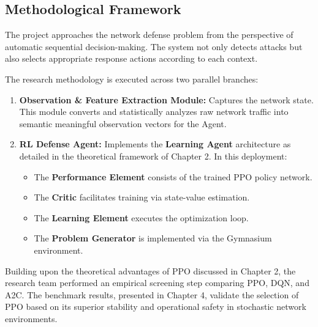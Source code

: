 \documentclass[12pt,a4paper]{report}
\begin{document}
\subsection{Methodological Framework}

The project approaches the network defense problem from the perspective of automatic sequential decision-making. The system not only detects attacks but also selects appropriate response actions according to each context.

The research methodology is executed across two parallel branches:
\begin{enumerate}
    \item \textbf{Observation \& Feature Extraction Module:} Captures the network state. This module converts and statistically analyzes raw network traffic into semantic meaningful observation vectors for the Agent.
    \item \textbf{RL Defense Agent:} Implements the \textbf{Learning Agent} architecture \cite{russell2020artificial} as detailed in the theoretical framework of Chapter 2. In this deployment:
    \begin{itemize}
        \item The \textbf{Performance Element} consists of the trained PPO policy network.
        \item The \textbf{Critic} facilitates training via state-value estimation.
        \item The \textbf{Learning Element} executes the optimization loop.
        \item The \textbf{Problem Generator} is implemented via the Gymnasium environment.
    \end{itemize}
\end{enumerate}

Building upon the theoretical advantages of PPO discussed in Chapter 2, the research team performed an empirical screening step comparing PPO, DQN, and A2C. The benchmark results, presented in Chapter 4, validate the selection of PPO based on its superior stability and operational safety in stochastic network environments.
\end{document}
